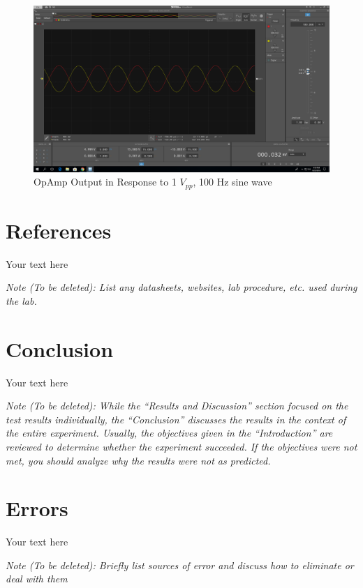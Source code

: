 \documentclass[10pt]{article}
\begin{document}
\begin{centering}
	\begin{figure} [H]
		\centering
		\includegraphics[scale=0.22]{images/invertingamplifier.png}
		\caption{OpAmp Output in Response to 1 $V_{pp}$, 100 Hz sine wave}
	\end{figure}
\end{centering}



\medskip


\section{References}

Your text here

\medskip

\textit{Note (To be deleted): List any datasheets, websites, lab procedure, etc. used during the lab.}

\section{Conclusion}

Your text here

\medskip

\textit{Note (To be deleted): While the ``Results and Discussion'' section focused on the test results individually, the ``Conclusion'' discusses the results in the context of the entire experiment. Usually, the objectives given in the ``Introduction'' are reviewed to determine whether the experiment succeeded. If the objectives were not met, you should analyze why the results were not as predicted.}

\section{Errors}

Your text here

\medskip

\textit{Note (To be deleted): Briefly list sources of error and discuss how to eliminate or deal with them}
\end{document}
